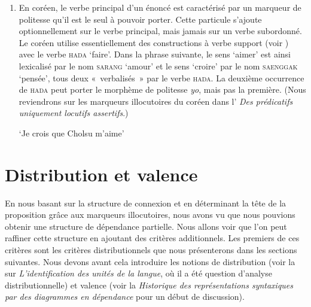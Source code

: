 {\begin{enumerate}
    \item En coréen, le verbe principal d’un énoncé est caractérisé par un marqueur de politesse qu’il est le seul à pouvoir porter. Cette particule s’ajoute optionnellement sur le verbe principal, mais jamais sur un verbe subordonné. Le coréen utilise essentiellement des constructions à verbe support (voir ) avec le verbe \textsc{hada} ‘faire’. Dans la phrase suivante, le sens ‘aimer’ est ainsi lexicalisé par le nom \textsc{sarang} ‘amour’ et le sens ‘croire’ par le nom \textsc{saenggak} ‘pensée’, tous deux «~verbalisés~» par le verbe \textsc{hada}. La deuxième occurrence de \textsc{hada} peut porter le morphème de politesse \textit{yo}, mais pas la première. (Nous reviendrons sur les marqueurs illocutoires du coréen dans l’ \textit{Des prédicatifs uniquement locutifs assertifs}.)

    \ea
    \glt   ‘Je crois que Cholsu m’aime’
    \z
    \z
    \end{enumerate}
}
\section{Distribution et valence}\label{sec:3.3.10}

En nous basant sur la structure de connexion et en déterminant la tête de la proposition grâce aux marqueurs illocutoires, nous avons vu que nous pouvions obtenir une structure de dépendance partielle. Nous allons voir que l’on peut raffiner cette structure en ajoutant des critères additionnels. Les premiers de ces critères sont les critères distributionnels que nous présenterons dans les sections suivantes. Nous devons avant cela introduire les notions de distribution (voir la  sur \textit{L’identification des unités de la langue}, où il a été question d’analyse distributionnelle) et valence (voir la  \textit{Historique des représentations syntaxiques par des diagrammes en dépendance} pour un début de discussion).


